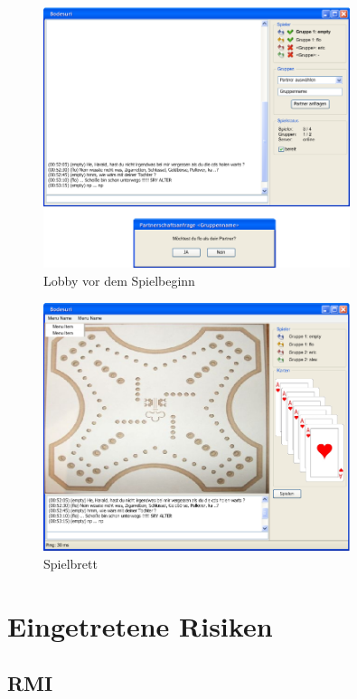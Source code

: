 \documentclass[a4paper,12pt,halfparskip,DIV14]{scrartcl}
\begin{document}
\begin{figure}	[htp] \centering 
	\includegraphics[width=0.8\textwidth]{Externes Design - Lobby.png} \caption{Lobby vor dem Spielbeginn}\label{fig:Externes_Design.jpg} 
\end{figure}
\begin{figure}
	[htp] \centering 
	\includegraphics[width=0.8\textwidth]{Externes Design - Spiel.png} \caption{Spielbrett}\label{fig:Externes_Design.jpg} 
\end{figure}


\clearpage
\section{Eingetretene Risiken} %
\label{eingetretene_risiken}

\subsection{RMI} %
\label{sub:rmi}
\end{document}
